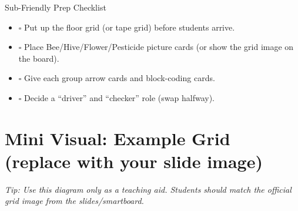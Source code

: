 \documentclass[11pt]{article}
\newcommand{\checkbox}{\(\square\)}
\newcommand{\BeeIcon}{%
  \tikz[baseline=-0.6ex,scale=0.23]{
    \draw[fill=BeeYellow,draw=black,line width=0.6pt] (0,0) ellipse (1.8 and 1.2);
    \draw[line width=0.6pt] (-0.9,0.8) .. controls (-1.6,1.6) and (-0.6,2.1) .. (0,1.4);
    \draw[line width=0.6pt] (0.9,0.8) .. controls (1.6,1.6) and (0.6,2.1) .. (0,1.4);
    \draw[line width=2.2pt] (-0.5,-1.0) -- (-0.5,1.0);
    \draw[line width=2.2pt] (0.2,-1.1) -- (0.2,1.1);
    \fill (1.55,0.25) circle (0.12);
  }%
}
\newcommand{\HiveIcon}{%
  \tikz[baseline=-0.6ex,scale=0.23]{
    \node[regular polygon,regular polygon sides=6,minimum size=9.5mm,draw=black,fill=HiveBrown!60] (h) {};
    \node[draw=black,fill=HiveBrown!20,rounded corners=1pt,minimum width=3.2mm,minimum height=2.2mm] at (h.center) {};
  }%
}
\newcommand{\FlowerIcon}{%
  \tikz[baseline=-0.6ex,scale=0.23]{
    \foreach \a in {0,60,120,180,240,300} {
      \draw[fill=FlowerPink!65,draw=black,line width=0.4pt] (\a:1.2) circle (0.7);
    }
    \draw[fill=BeeYellow!70,draw=black,line width=0.5pt] (0,0) circle (0.75);
  }%
}
\newcommand{\PesticideIcon}{%
  \tikz[baseline=-0.6ex,scale=0.23]{
    \node[regular polygon,regular polygon sides=3,minimum size=10mm,draw=black,fill=PesticideRed!55] (t) {};
    \node at ($(t.center)+(0,-0.5)$) {\bfseries\Large !};
  }%
}
\begin{document}
\begin{callout}[colback=BeeYellow!10,colframe=BeeYellow!70!black]{Sub-Friendly Prep Checklist}
\begin{itemize}[leftmargin=*, itemsep=4pt, topsep=2pt]
  \item \checkbox{} Put up the floor grid (or tape grid) before students arrive.
  \item \checkbox{} Place Bee/Hive/Flower/Pesticide picture cards (or show the grid image on the board).
  \item \checkbox{} Give each group arrow cards and block-coding cards.
  \item \checkbox{} Decide a ``driver'' and ``checker'' role (swap halfway).
\end{itemize}
\end{callout}

\section*{Mini Visual: Example Grid (replace with your slide image)}
\begin{center}
\end{center}
\textit{Tip: Use this diagram only as a teaching aid. Students should match the official grid image from the slides/smartboard.}
\end{document}
